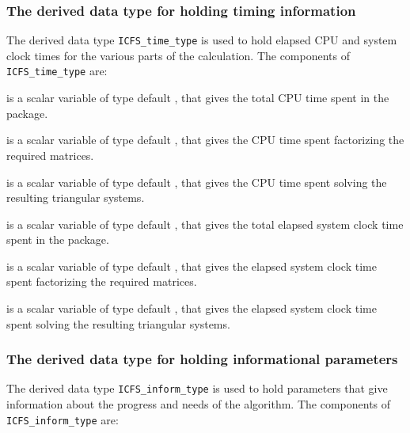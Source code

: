 \documentclass{galahad}
\newcommand{\packagename}{ICFS}
\begin{document}

\subsubsection{The derived data type for holding timing
 information}\label{typetime}
The derived data type
{\tt \packagename\_time\_type}
is used to hold elapsed CPU and system clock times for the various parts of
the calculation. The components of
{\tt \packagename\_time\_type}
are:
\begin{description}
 is a scalar variable of type default \realdp, that gives
 the total CPU time spent in the package.

 is a scalar variable of type default \realdp, that gives
 the CPU time spent factorizing the required matrices.

 is a scalar variable of type default \realdp, that gives
 the CPU time spent solving the resulting triangular systems.

 is a scalar variable of type default \realdp, that gives
 the total elapsed system clock time spent in the package.

 is a scalar variable of type default \realdp, that gives
 the elapsed system clock time spent factorizing the required matrices.

 is a scalar variable of type default \realdp, that gives
 the elapsed system clock time spent solving the resulting triangular systems.

\end{description}


\subsubsection{The derived data type for holding informational
 parameters}\label{typeinform}
The derived data type 
{\tt \packagename\_inform\_type} 
is used to hold parameters that give information about the progress and needs 
of the algorithm. The components of 
{\tt \packagename\_inform\_type} 
are:
\end{document}
